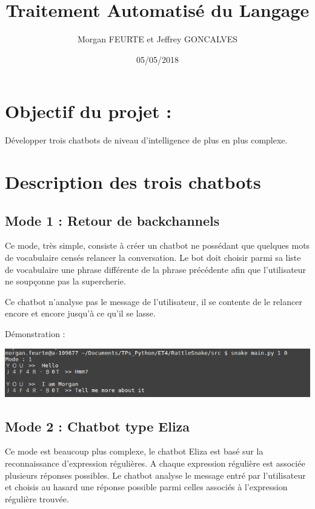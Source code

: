 \documentclass[paper=a4, fontsize=11pt]{article}
\begin{document}
\title{Traitement Automatisé du Langage}
\author{Morgan FEURTE et Jeffrey GONCALVES}
\date{05/05/2018}
\maketitle

\section{Objectif du projet :}
Développer trois chatbots de niveau d'intelligence de plus en plus complexe.

\section{Description des trois chatbots}
\subsection{Mode 1 : Retour de backchannels}
Ce mode, très simple, consiste à créer un chatbot ne possédant que quelques mots de vocabulaire censés relancer la conversation. Le bot doit choisir parmi sa liste de vocabulaire une phrase différente de la phrase précédente afin que l'utilisateur ne soupçonne pas la supercherie.

Ce chatbot n'analyse pas le message de l'utilisateur, il se contente de le relancer encore et encore jusqu'à ce qu'il se lasse.


Démonstration :

\begin{center}
\includegraphics[width=500pt]{MeanBot_mode1.png}
\end{center}

\subsection{Mode 2 : Chatbot type Eliza}
Ce mode est beaucoup plus complexe, le chatbot Eliza est basé sur la reconnaissance d'expression régulières. A chaque expression régulière est associée plusieurs réponses possibles. Le chatbot analyse le message entré par l'utilisateur et choisis au hasard une réponse possible parmi celles associés à l'expression régulière trouvée.
\end{document}

